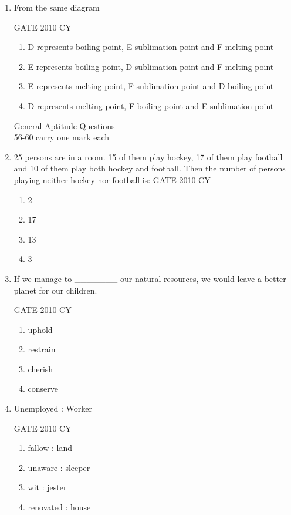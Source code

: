\documentclass[journal,12pt,onecolumn]{IEEEtran}
\theoremstyle{remark}
\begin{document}
\begin{enumerate}
\item From the same diagram

\hfill{GATE 2010 CY}
\begin{multicols}{2}
\begin{enumerate}
    \item D represents boiling point, E sublimation point and F melting point
    \item E represents boiling point, D sublimation point and F melting point
    \item E represents melting point, F sublimation point and D boiling point
    \item D represents melting point, F boiling point and E sublimation point
\end{enumerate}
\end{multicols}
General Aptitude Questions\\
56-60 carry one mark each
\item 25 persons are in a room. 15 of them play hockey, 17 of them play football and 10 of them play both hockey and football. Then the number of persons playing neither hockey nor football is:
\hfill{GATE 2010 CY}

\begin{multicols}{2}
\begin{enumerate}
    \item 2
    \item 17
    \item 13
    \item 3
\end{enumerate}
\end{multicols}

\item If we manage to \_\_\_\_\_\_\_ our natural resources, we would leave a better planet for our children.

\hfill{GATE 2010 CY}
\begin{multicols}{2}
\begin{enumerate}
    \item uphold
    \item restrain
    \item cherish
    \item conserve
\end{enumerate}
\end{multicols}

\item Unemployed : Worker

\hfill{GATE 2010 CY}
\begin{multicols}{2}
\begin{enumerate}
    \item fallow : land
    \item unaware : sleeper
    \item wit : jester
    \item renovated : house
\end{enumerate}
\end{multicols}


\end{enumerate}
\end{document}
